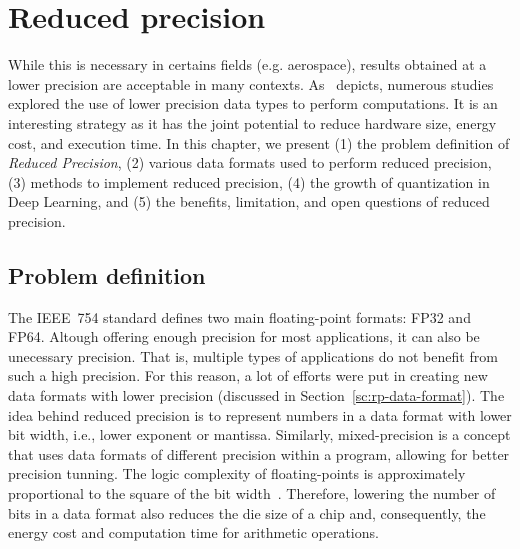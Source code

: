 \chapter{Reduced precision}
\label{ch:reduced-precision}
While this is necessary in certains fields (e.g. aerospace), results obtained at a lower
precision are acceptable in many contexts.
As~\cite{Cherubin2020-tt} depicts, numerous studies explored the use of lower 
precision data types to perform computations.
It is an interesting strategy as it has the joint potential to reduce hardware 
size, energy cost, and execution time.
In this chapter, we present (1) the problem definition of \textit{Reduced Precision},
(2) various data formats used to perform reduced precision,
(3) methods to implement reduced precision,
(4) the growth of quantization in Deep Learning,
and (5) the benefits, limitation, and open questions of reduced precision.

\section{Problem definition}
\label{sc:rp-problem-definiton}
The IEEE~754 standard defines two main floating-point formats: FP32 and FP64.
Altough offering enough precision for most applications, it can also be unecessary precision.
That is, multiple types of applications do not benefit from such a high precision.
For this reason, a lot of efforts were put in creating new data formats with lower precision (discussed in Section~\ref{sc:rp-data-format}).
The idea behind reduced precision is to represent numbers in a data format with 
lower bit width, i.e., lower exponent or mantissa.
Similarly, mixed-precision is a concept that uses data formats of different precision within a program, allowing for better precision tunning.
The logic complexity of floating-points is approximately proportional to the square of the bit width~\cite{Chen2018-an}.
Therefore, lowering the number of bits in a data format also reduces the die size 
of a chip and, consequently, the energy cost and computation time for arithmetic operations.

